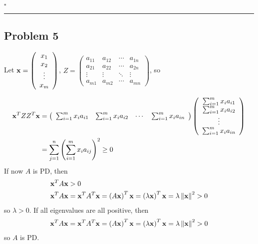 \documentclass[12pt]{article}
\newcommand*{\QEDB}{\hfill\ensuremath{\square}}
\newcommand{\ParTh}[1]{\left(#1\right)}
\newcommand{\BF}[1]{{\bf#1}}
\newcommand{\Matrix}[2]{\ParTh{\begin{array}{#1}#2\end{array}}}
\newcommand{\horrule}[1]{\rule{\linewidth}{#1}}
\begin{document}
\QEDB

\horrule{0.5pt}

\subsection*{Problem 5}

Let $\BF{x}=\Matrix{c}{x_1\\x_2\\\vdots\\x_m}$, $Z=\Matrix{cccc}{a_{11}&a_{12}&\cdots&a_{1n}\\a_{21}&a_{22}&\cdots&a_{2n}\\\vdots&\vdots&\ddots&\vdots\\a_{m1}&a_{m2}&\cdots&a_{mn}}$, so
\begin{comment}
\begin{align}
\BF{x}^TZZ^T\BF{x}&=\BF{x}^T\Matrix{cccc}{\sum_{i=1}^{n}a^2_{1i}&\sum_{i=1}^{n}a_{1i}a_{2i}&\cdots&\sum_{i=1}^{n}a_{1i}a_{mi}\\\sum_{i=1}^{n}a_{2i}a_{1i}&\sum_{i=1}^{n}a^2_{2i}&\cdots&\sum_{i=1}^{n}a_{2i}a_{mi}\\\vdots&\vdots&\ddots&\vdots\\\sum_{i=1}^{n}a_{mi}a_{1i}&\sum_{i=1}^{n}a_{mi}a_{2i}&\cdots&\sum_{i=1}^{n}a^2_{mi}}\BF{x}\\
&=\Matrix{cc}{x_1\sum_{i=1}^{n}a^2_{1i}+\cdots+x_m\sum_{i=1}^{n}a_{mi}a_{1i}&\cdots}\Matrix{c}{x_1\\x_2\\\vdots\\x_m}\\
&=\sum_{1\leq i,~j\leq m} \ParTh{x_{i}x_j\sum_{r=1}^{n}a_{ir}a_{jr}}
\end{align}
\end{comment}
\begin{align}
\BF{x}^TZZ^T\BF{x}&=\Matrix{cccc}{\sum_{i=1}^{m}x_ia_{i1}&\sum_{i=1}^{m}x_ia_{i2}&\cdots&\sum_{i=1}^{m}x_ia_{in}}\Matrix{c}{\sum_{i=1}^{m}x_ia_{i1}\\\sum_{i=1}^{m}x_ia_{i2}\\\vdots\\\sum_{i=1}^{m}x_ia_{in}}\\
&=\sum_{j=1}^{n}\ParTh{\sum_{i=1}^{m}x_ia_{ij}}^2\geq0
\end{align}
If now $A$ is PD, then
\begin{align}
\BF{x}^TA\BF{x}&>0\\\BF{x}^TA\BF{x}&=\BF{x}^TA^T\BF{x}=\ParTh{A\BF{x}}^T\BF{x}=\ParTh{\lambda\BF{x}}^T\BF{x}=\lambda\left\|\BF{x}\right\|^2>0
\end{align}
so $\lambda>0$.
If all eigenvalues are all positive, then
\begin{align}
\BF{x}^TA\BF{x}=\BF{x}^TA^T\BF{x}=\ParTh{A\BF{x}}^T\BF{x}=\ParTh{\lambda\BF{x}}^T\BF{x}=\lambda\left\|\BF{x}\right\|^2>0
\end{align}
so $A$ is PD.
\end{document}
